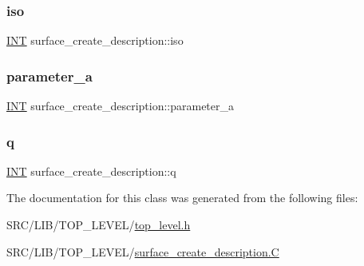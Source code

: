 \mbox{\label{classsurface__create__description_a744c6b83d1cc4e7356b2e4c75f1a5900}} 
\subsubsection{\texorpdfstring{iso}{iso}}
{\footnotesize\ttfamily \mbox{\hyperlink{galois_8h_a09fddde158a3a20bd2dcadb609de11dc}{I\+NT}} surface\+\_\+create\+\_\+description\+::iso}

\mbox{\label{classsurface__create__description_ab75ad5010dd23b73dc3c1a9fd42052c7}} 
\subsubsection{\texorpdfstring{parameter\+\_\+a}{parameter\_a}}
{\footnotesize\ttfamily \mbox{\hyperlink{galois_8h_a09fddde158a3a20bd2dcadb609de11dc}{I\+NT}} surface\+\_\+create\+\_\+description\+::parameter\+\_\+a}

\mbox{\label{classsurface__create__description_a5ddf7713ad98c28c0e81e253f557baa2}} 
\subsubsection{\texorpdfstring{q}{q}}
{\footnotesize\ttfamily \mbox{\hyperlink{galois_8h_a09fddde158a3a20bd2dcadb609de11dc}{I\+NT}} surface\+\_\+create\+\_\+description\+::q}



The documentation for this class was generated from the following files\+:\begin{DoxyCompactItemize}
\item 
S\+R\+C/\+L\+I\+B/\+T\+O\+P\+\_\+\+L\+E\+V\+E\+L/\mbox{\hyperlink{top__level_8h}{top\+\_\+level.\+h}}\item 
S\+R\+C/\+L\+I\+B/\+T\+O\+P\+\_\+\+L\+E\+V\+E\+L/\mbox{\hyperlink{surface__create__description_8_c}{surface\+\_\+create\+\_\+description.\+C}}\end{DoxyCompactItemize}
